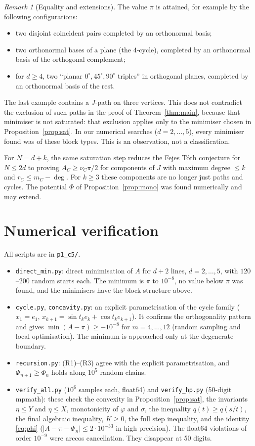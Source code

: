 \documentclass[11pt]{article}
\theoremstyle{remark}
\newtheorem{remark}[theorem]{Remark}
\begin{document}
\begin{remark}[Equality and extensions]
The value $\pi$ is attained, for example by the following configurations:
\begin{itemize}
\item two disjoint coincident pairs completed by an orthonormal basis;
\item two orthonormal bases of a plane (the $4$-cycle), completed by an orthonormal basis of the orthogonal complement;
\item for $d\ge4$, two ``planar $0^\circ,45^\circ,90^\circ$ triples'' in orthogonal planes, completed by an orthonormal basis of the rest.
\end{itemize}
The last example contains a $J$-path on three vertices. This does not contradict the exclusion of such paths in the proof of Theorem~\ref{thm:main}, because that minimiser is not saturated: that exclusion applies only to the minimiser chosen in Proposition~\ref{prop:sat}. In our numerical searches ($d=2,\dots,5$), every minimiser found was of these block types. This is an observation, not a classification.

For $N=d+k$, the same saturation step reduces the Fejes T\'oth conjecture for $N\le 2d$ to proving $A_C\ge\nu_C\pi/2$ for components of $J$ with maximum degree $\le k$ and $r_C\le m_C-\deg$. For $k\ge3$ these components are no longer just paths and cycles. The potential $\Phi$ of Proposition~\ref{prop:mono} was found numerically and may extend.
\end{remark}

\section{Numerical verification}\label{sec:num}
All scripts are in \texttt{p1\_c5/}.
\begin{itemize}
\item \texttt{direct\_min.py}: direct minimisation of $A$ for $d+2$ lines,
$d=2,\dots,5$, with $120$--$200$ random starts each. The minimum is $\pi$ to
$10^{-8}$, no value below $\pi$ was found, and the minimisers have the block structure above.
\item \texttt{cycle.py}, \texttt{concavity.py}: an explicit
parametrisation of the cycle family ($x_1=e_1$,
$x_{k+1}=\sin t_ke_k+\cos t_ke_{k+1}$). It confirms the orthogonality pattern
and gives $\min(A-\pi)\ge-10^{-8}$ for $m=4,\dots,12$ (random sampling and local
optimisation). The minimum is approached only at the degenerate boundary.
\item \texttt{recursion.py}: (R1)--(R3) agree with the explicit
parametrisation, and $\Phi_{n+1}\ge\Phi_n$ holds along $10^5$ random chains.
\item \texttt{verify\_all.py} ($10^6$ samples each, float64) and
\texttt{verify\_hp.py} (50-digit mpmath): these check the convexity in
Proposition~\ref{prop:sat}, the invariants $\eta\le Y$ and $\eta\le X$,
monotonicity of $\varphi$ and $\sigma$, the inequality $q(t)\ge q(s/t)$, the final
algebraic inequality, $K\ge0$, the full step inequality, and the identity
\eqref{eq:phi} ($|A-\pi-\Phi_n|\le2\cdot10^{-33}$ in high precision).
The float64 violations of order $10^{-9}$ were arccos cancellation. They
disappear at 50 digits.
\end{itemize}
\end{document}
